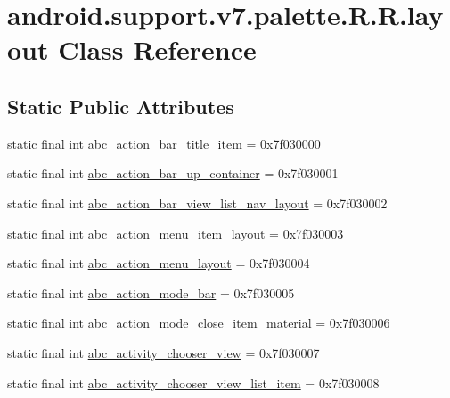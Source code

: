 \hypertarget{classandroid_1_1support_1_1v7_1_1palette_1_1_r_1_1layout}{
\section{android.support.v7.palette.R.R.layout Class Reference}
\label{classandroid_1_1support_1_1v7_1_1palette_1_1_r_1_1layout}
}
\subsection*{Static Public Attributes}
\begin{CompactItemize}
\item 
static final int \hyperlink{classandroid_1_1support_1_1v7_1_1palette_1_1_r_1_1layout_9875ddef099c61f06b51399d2b24d44a}{abc\_\-action\_\-bar\_\-title\_\-item} = 0x7f030000
\item 
static final int \hyperlink{classandroid_1_1support_1_1v7_1_1palette_1_1_r_1_1layout_db6ee333ba319c7fb1114b9703540e1a}{abc\_\-action\_\-bar\_\-up\_\-container} = 0x7f030001
\item 
static final int \hyperlink{classandroid_1_1support_1_1v7_1_1palette_1_1_r_1_1layout_7decae7689504f8b37d5fc7401170e00}{abc\_\-action\_\-bar\_\-view\_\-list\_\-nav\_\-layout} = 0x7f030002
\item 
static final int \hyperlink{classandroid_1_1support_1_1v7_1_1palette_1_1_r_1_1layout_e2ef2fe0217197200b7ebe2283acc45c}{abc\_\-action\_\-menu\_\-item\_\-layout} = 0x7f030003
\item 
static final int \hyperlink{classandroid_1_1support_1_1v7_1_1palette_1_1_r_1_1layout_6672def80fbe86c5d64b002527266281}{abc\_\-action\_\-menu\_\-layout} = 0x7f030004
\item 
static final int \hyperlink{classandroid_1_1support_1_1v7_1_1palette_1_1_r_1_1layout_f229d6b36ef03afb7def89580800f0fa}{abc\_\-action\_\-mode\_\-bar} = 0x7f030005
\item 
static final int \hyperlink{classandroid_1_1support_1_1v7_1_1palette_1_1_r_1_1layout_41c72be9ae005624c39e104f1bd024d6}{abc\_\-action\_\-mode\_\-close\_\-item\_\-material} = 0x7f030006
\item 
static final int \hyperlink{classandroid_1_1support_1_1v7_1_1palette_1_1_r_1_1layout_2ff28e49ac1bc2e1582b48ed4f8b7576}{abc\_\-activity\_\-chooser\_\-view} = 0x7f030007
\item 
static final int \hyperlink{classandroid_1_1support_1_1v7_1_1palette_1_1_r_1_1layout_8c9f21a8842950e861a3205ef21c1b93}{abc\_\-activity\_\-chooser\_\-view\_\-list\_\-item} = 0x7f030008

\end{CompactItemize}

